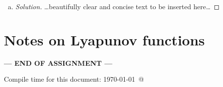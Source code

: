 \documentclass[12pt]{article}
\begin{document}
\begin{enumerate}[(a)]
\item \basicSIRanalQd

{\color{blue}
\begin{proof}[Solution]
{\color{magenta}\dots beautifully clear and concise text to be inserted here\dots}
\end{proof}
}

\end{enumerate}

\newpage
\hypertarget{NotesLyapFuns}{}
\section*{Notes on Lyapunov functions}

\NotesOnLyapunovFunctions




\bigskip

\centerline{\bf--- END OF ASSIGNMENT ---}

\bigskip
Compile time for this document:
\today\ @ \thistime
\end{document}
